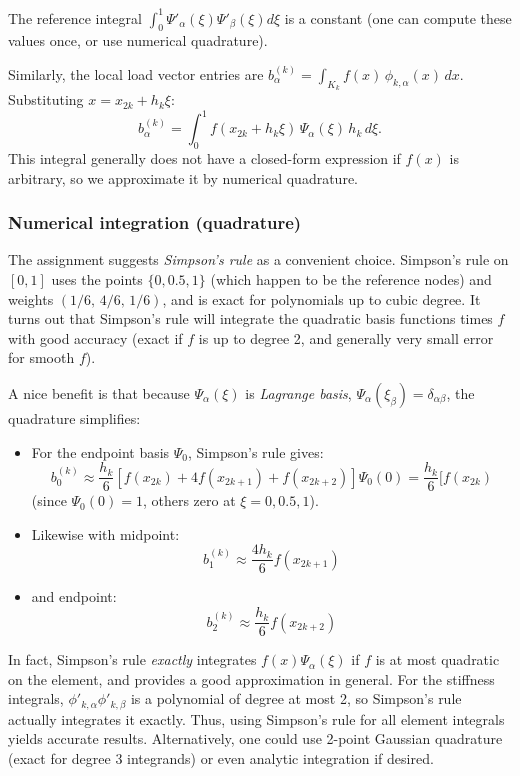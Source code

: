 \documentclass[a4paper,10pt]{report}
\begin{document}
The reference integral \(\int_0^1 \Psi'_{\alpha}(\xi)\Psi'_{\beta}(\xi)d\xi\) is a constant (one can compute these values once, or use numerical quadrature).

Similarly, the local load vector entries are \(b^{(k)}_{\alpha} = \int_{K_k} f(x)\,\phi_{k,\alpha}(x)\,dx\).
Substituting \(x = x_{2k}+h_k\xi\):
\[b^{(k)}_{\alpha} = \int_{0}^{1} f(x_{2k}+h_k\xi)\,\Psi_{\alpha}(\xi)\,h_k\,d\xi.\]
This integral generally does not have a closed-form expression if \(f(x)\) is arbitrary, so we approximate it by numerical quadrature.

\subsubsection*{Numerical integration (quadrature)}
The assignment suggests \emph{Simpson's rule} as a convenient choice.
Simpson's rule on \([0,1]\) uses the points \(\{0, 0.5, 1\}\) (which happen to be the reference nodes) and weights \((1/6,\,4/6,\,1/6)\), and is exact for polynomials up to cubic degree. 
It turns out that Simpson's rule will integrate the quadratic basis functions times \(f\) with good accuracy (exact if \(f\) is up to degree 2, and generally very small error for smooth \(f\)). 

A nice benefit is that because \(\Psi_\alpha(\xi)\) is \emph{Lagrange basis}, \(\Psi_{\alpha}(\xi_\beta) = \delta_{\alpha\beta}\), the quadrature simplifies:

\begin{itemize}
	\item For the endpoint basis \(\Psi_0\), Simpson's rule gives:
	\[
	b^{(k)}_0 \approx \frac{h_k}{6}[f(x_{2k}) + 4f(x_{2k+1}) + f(x_{2k+2})] \Psi_0(0) = \frac{h_k}{6}[f(x_{2k})
	\] 
	(since \(\Psi_0(0)=1\), others zero at \(\xi=0,0.5,1\)).
	\item Likewise with midpoint:
	\[
	b^{(k)}_1 \approx \frac{4h_k}{6} f(x_{2k+1})
	\]
	\item and endpoint:
	\[
	b^{(k)}_2 \approx \frac{h_k}{6} f(x_{2k+2}) 	
	\]
\end{itemize}

In fact, Simpson's rule \emph{exactly} integrates \(f(x)\Psi_\alpha(\xi)\) if \(f\) is at most quadratic on the element, and provides a good approximation in general.
For the stiffness integrals, \(\phi'_{k,\alpha}\phi'_{k,\beta}\) is a polynomial of degree at most 2, so Simpson's rule actually integrates it exactly.
Thus, using Simpson's rule for all element integrals yields accurate results.
Alternatively, one could use 2-point Gaussian quadrature (exact for degree 3 integrands) or even analytic integration if desired.
\end{document}
